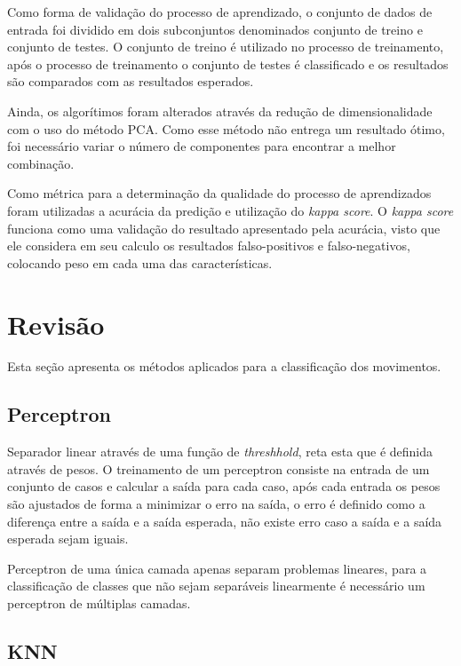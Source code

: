 \documentclass[12pt]{article}
\begin{document}
	Como forma de validação do processo de aprendizado, o conjunto de dados de entrada foi dividido em dois subconjuntos denominados conjunto de treino e conjunto de testes. O conjunto de treino é utilizado no processo de treinamento, após o processo de treinamento o conjunto de testes é classificado e os resultados são comparados com as resultados esperados.
	
	Ainda, os algorítimos foram alterados através da redução de dimensionalidade com o uso do método PCA. Como esse método não entrega um resultado ótimo, foi necessário variar o número de componentes para encontrar a melhor combinação.

	Como métrica para a determinação da qualidade do processo de aprendizados foram utilizadas a acurácia da predição e utilização do \emph{kappa score}. O \textit{kappa score} funciona como uma validação do resultado apresentado pela acurácia, visto que ele considera em seu calculo os resultados falso-positivos e falso-negativos, colocando peso em cada uma das características. 

\section{Revisão}

	Esta seção apresenta os métodos aplicados para a classificação dos movimentos.

\subsection{Perceptron}


	Separador linear através de uma função de \emph{threshhold}, reta esta que é definida através de pesos. O treinamento de um perceptron consiste na entrada de um conjunto de casos e calcular a saída para cada caso, após cada entrada os pesos são ajustados de forma a minimizar o erro na saída, o erro é definido como a diferença entre a saída e a saída esperada, não existe erro caso a saída e a saída esperada sejam iguais.
	
	Perceptron de uma única camada apenas separam problemas lineares, para a classificação de classes que não sejam separáveis linearmente é necessário um perceptron de múltiplas camadas.
	
\subsection{KNN}
\end{document}
